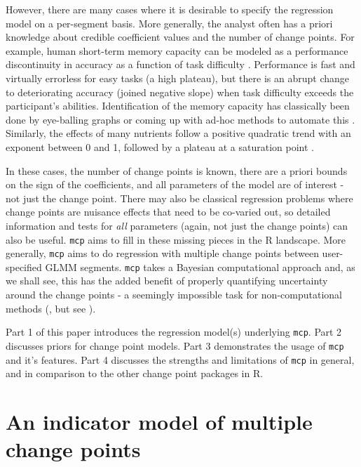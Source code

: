 \documentclass[
  american,
]{article}
\begin{document}
However, there are many cases where it is desirable to specify the regression model on a per-segment basis. More generally, the analyst often has a priori knowledge about credible coefficient values and the number of change points. For example, human short-term memory capacity can be modeled as a performance discontinuity in accuracy as a function of task difficulty \citep{cowan2000, camos2008, leibovich-raveh2018}. Performance is fast and virtually errorless for easy tasks (a high plateau), but there is an abrupt change to deteriorating accuracy (joined negative slope) when task difficulty exceeds the participant's abilities. Identification of the memory capacity has classically been done by eye-balling graphs or coming up with ad-hoc methods to automate this \citep{leibovich-raveh2018}. Similarly, the effects of many nutrients follow a positive quadratic trend with an exponent between 0 and 1, followed by a plateau at a saturation point \citep{pesti2009}.

In these cases, the number of change points is known, there are a priori bounds on the sign of the coefficients, and all parameters of the model are of interest - not just the change point. There may also be classical regression problems where change points are nuisance effects that need to be co-varied out, so detailed information and tests for \emph{all} parameters (again, not just the change points) can also be useful. \texttt{mcp} aims to fill in these missing pieces in the R landscape. More generally, \texttt{mcp} aims to do regression with multiple change points between user-specified GLMM segments. \texttt{mcp} takes a Bayesian computational approach and, as we shall see, this has the added benefit of properly quantifying uncertainty around the change points - a seemingly impossible task for non-computational methods (\citep{stephens1994, carlin1992}, but see \citep{jensen2013}).

Part 1 of this paper introduces the regression model(s) underlying \texttt{mcp}. Part 2 discusses priors for change point models. Part 3 demonstrates the usage of \texttt{mcp} and it's features. Part 4 discusses the strengths and limitations of \texttt{mcp} in general, and in comparison to the other change point packages in R.

\hypertarget{an-indicator-model-of-multiple-change-points}{%
\section{An indicator model of multiple change points}\label{an-indicator-model-of-multiple-change-points}}
\end{document}
